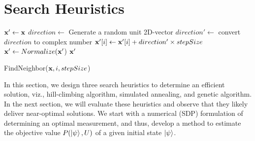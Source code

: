 \section{Search Heuristics}
\label{sec:searching}

\begin{algorithm}[ht] 
	$\mathbf{x}' \leftarrow \mathbf{x}$ \;
	$direction \leftarrow$ Generate a random unit 2D-vector \;
	$direction' \leftarrow$ convert $direction$ to complex number \;
	$\mathbf{x}'[i] \leftarrow \mathbf{x}'[i] + direction' \times stepSize$ \;
	$\mathbf{x}' \leftarrow Normalize(\mathbf{x}'$) 
	\Return $\mathbf{x}'$ \;
	\caption{FindNeighbor($\mathbf{x}, i, stepSize$)}
\label{algo:find-neighbor}
\end{algorithm}

In this section, we design three search heuristics to determine an efficient
\iso solution, viz., hill-climbing algorithm, simulated annealing, and genetic algorithm. In the next section, we will evaluate these heuristics and observe
that they likely deliver near-optimal solutions. 
We start with a numerical (SDP) formulation of determining an optimal 
measurement, and thus, develop a method to estimate the objective value
$P(\ket{\psi}, U)$ of a given initial state $\ket{\psi}$.

